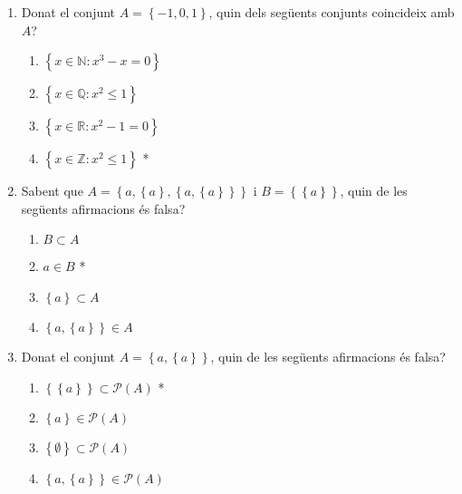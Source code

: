 

\begin{enumerate}
\item Donat el conjunt $A=\left\{ -1,0,1\right\} $, quin dels seg\"{u}ents
conjunts coincideix amb $A$?

\begin{enumerate}
\item $\left\{ x\in\mathbb{N}:x^{3}-x=0\right\} $

\item $\left\{ x\in\mathbb{Q}:x^{2}\leq1\right\} $

\item $\left\{ x\in\mathbb{R}:x^{2}-1=0\right\} $

\item $\left\{ x\in \mathbb{Z}:x^{2}\leq 1\right\} $ *
\end{enumerate}

\item Sabent que $A=\left\{ a,\left\{ a\right\} ,\left\{ a,\left\{ a\right\}
\right\} \right\} $ i $B=\left\{ \left\{ a\right\} \right\} $, quin de les
seg\"{u}ents afirmacions \'{e}s falsa?

\begin{enumerate}
\item $B\subset A$

\item $a\in B$ *

\item $\left\{ a\right\} \subset A$

\item $\left\{ a,\left\{ a\right\} \right\} \in A$
\end{enumerate}

\item Donat el conjunt $A=\left\{ a,\left\{ a\right\} \right\} $, quin de
les seg\"{u}ents afirmacions \'{e}s falsa?

\begin{enumerate}
\item $\left\{ \left\{ a\right\} \right\} \subset \mathcal{P}(A)$ *

\item $\left\{ a\right\} \in\mathcal{P}(A)$

\item $\left\{ \emptyset\right\} \subset\mathcal{P}(A)$

\item $\left\{ a,\left\{ a\right\} \right\} \in\mathcal{P}(A)$
\end{enumerate}


\end{enumerate}
